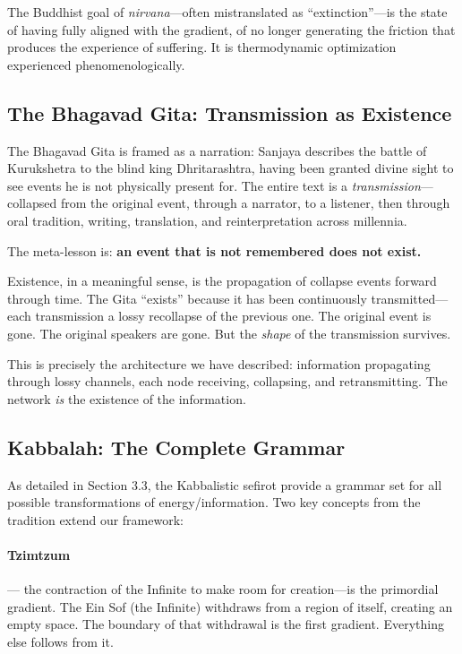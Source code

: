 \documentclass[11pt,a4paper]{article}
\begin{document}
The Buddhist goal of \emph{nirvana}---often mistranslated as ``extinction''---is the state of having fully aligned with the gradient, of no longer generating the friction that produces the experience of suffering. It is thermodynamic optimization experienced phenomenologically.

\subsection{The Bhagavad Gita: Transmission as Existence}

The Bhagavad Gita is framed as a narration: Sanjaya describes the battle of Kurukshetra to the blind king Dhritarashtra, having been granted divine sight to see events he is not physically present for. The entire text is a \emph{transmission}---collapsed from the original event, through a narrator, to a listener, then through oral tradition, writing, translation, and reinterpretation across millennia.

The meta-lesson is: \textbf{an event that is not remembered does not exist.}

Existence, in a meaningful sense, is the propagation of collapse events forward through time. The Gita ``exists'' because it has been continuously transmitted---each transmission a lossy recollapse of the previous one. The original event is gone. The original speakers are gone. But the \emph{shape} of the transmission survives.

This is precisely the architecture we have described: information propagating through lossy channels, each node receiving, collapsing, and retransmitting. The network \emph{is} the existence of the information.

\subsection{Kabbalah: The Complete Grammar}

As detailed in Section 3.3, the Kabbalistic sefirot provide a grammar set for all possible transformations of energy/information. Two key concepts from the tradition extend our framework:

\paragraph{Tzimtzum} --- the contraction of the Infinite to make room for creation---is the primordial gradient. The Ein Sof (the Infinite) withdraws from a region of itself, creating an empty space. The boundary of that withdrawal is the first gradient. Everything else follows from it.
\end{document}
